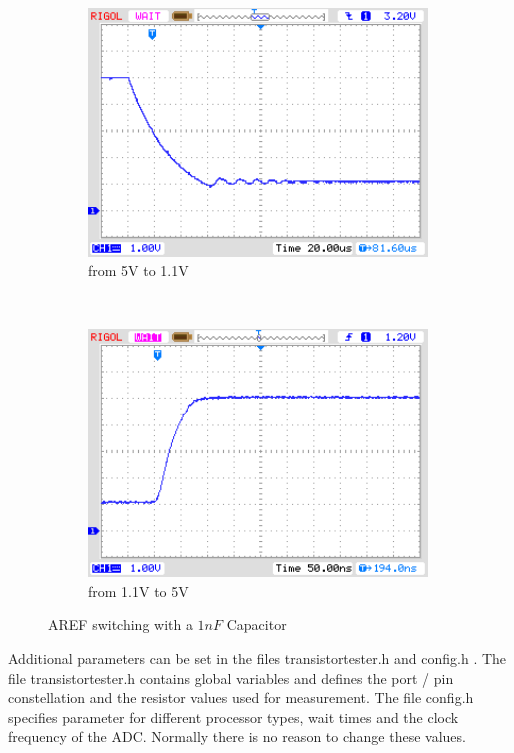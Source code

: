 \begin{figure}[H]
  \begin{subfigure}[b]{9cm}
    \centering
    \includegraphics[width=9cm]{../PNG/AREF2_1V.png}
    \caption{from 5V to 1.1V }
    \label{pic:aref1}
  \end{subfigure}
  ~
  \begin{subfigure}[b]{9cm}
    \centering
    \includegraphics[width=9cm]{../PNG/AREF2VCC.png}
    \caption{from 1.1V to 5V}
    \label{pic:aref5}
  \end{subfigure}
  \caption{AREF switching with a \(1nF\) Capacitor}
\end{figure}


Additional parameters can be set in the files transistortester.h and config.h .
The file transistortester.h contains global variables and defines the port / pin constellation
and the resistor values used for measurement.
The file config.h specifies parameter for different processor types, wait times and the clock
frequency of the ADC. Normally there is no reason to change these values.

